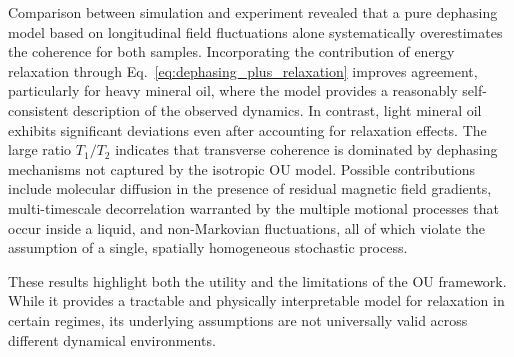 \documentclass[%
 reprint,
 amsmath,amssymb,
 aps,
]{revtex4-2}
\begin{document}
Comparison between simulation and experiment revealed that a pure dephasing model based on longitudinal field fluctuations alone systematically overestimates the coherence for both samples. Incorporating the contribution of energy relaxation through Eq.~\ref{eq:dephasing_plus_relaxation} improves agreement, particularly for heavy mineral oil, where the model provides a reasonably self-consistent description of the observed dynamics. In contrast, light mineral oil exhibits significant deviations even after accounting for relaxation effects. The large ratio $T_1/T_2$ indicates that transverse coherence is dominated by dephasing mechanisms not captured by the isotropic OU model. Possible contributions include molecular diffusion in the presence of residual magnetic field gradients, multi-timescale decorrelation warranted by the multiple motional processes that occur inside a liquid, and non-Markovian fluctuations, all of which violate the assumption of a single, spatially homogeneous stochastic process.

These results highlight both the utility and the limitations of the OU framework. While it provides a tractable and physically interpretable model for relaxation in certain regimes, its underlying assumptions are not universally valid across different dynamical environments.


\end{document}
